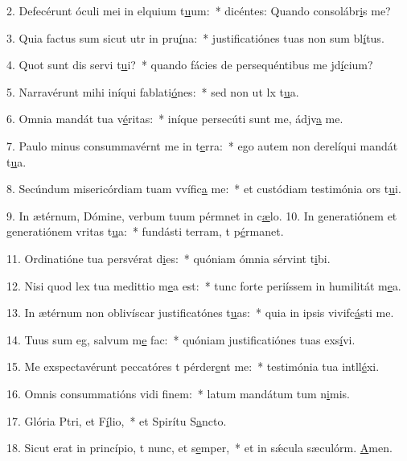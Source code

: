 2. Defecérunt óculi mei in elquium t\uline{u}um:~* dicéntes: Quando consolábr\uline{i}s me?\par 
3. Quia factus sum sicut utr in pru\uline{í}na:~* justificatiónes tuas non sum bl\uline{í}tus.\par 
4. Quot sunt dis servi t\uline{u}i?~* quando fácies de persequéntibus me jd\uline{í}cium?\par 
5. Narravérunt mihi iníqui fablati\uline{ó}nes:~* sed non ut lx t\uline{u}a.\par 
6. Omnia mandát tua v\uline{é}ritas:~* iníque persecúti sunt me, ádjv\uline{a} me.\par 
7. Paulo minus consummavérnt me in t\uline{e}rra:~* ego autem non derelíqui mandát t\uline{u}a.\par 
8. Secúndum misericórdiam tuam vvífic\uline{a} me:~* et custódiam testimónia ors t\uline{u}i.\par 
9. In ætérnum, Dómine, verbum tuum pérmnet in c\uline{æ}lo.
10. In generatiónem et generatiónem vritas t\uline{u}a:~* fundásti terram, t p\uline{é}rmanet.\par 
11. Ordinatióne tua persvérat d\uline{i}es:~* quóniam ómnia sérvint t\uline{i}bi.\par 
12. Nisi quod lex tua medittio m\uline{e}a est:~* tunc forte periíssem in humilitát m\uline{e}a.\par 
13. In ætérnum non oblivíscar justificatónes t\uline{u}as:~* quia in ipsis vivifc\uline{á}sti me.\par 
14. Tuus sum eg, salvum m\uline{e} fac:~* quóniam justificatiónes tuas exs\uline{í}vi.\par 
15. Me exspectavérunt peccatóres t pérder\uline{e}nt me:~* testimónia tua intll\uline{é}xi.\par 
16. Omnis consummatións vidi f\uline{i}nem:~* latum mandátum tum n\uline{i}mis.\par 
17. Glória Ptri, et F\uline{í}lio,~* et Spirítu S\uline{a}ncto.\par 
18. Sicut erat in princípio, t nunc, et s\uline{e}mper,~* et in sǽcula sæculórm. \uline{A}men.\par 
